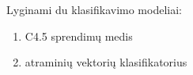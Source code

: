 
Lyginami du klasifikavimo modeliai:
\begin{enumerate}
\item C4.5 sprendimų medis
\item atraminių vektorių klasifikatorius
\end{enumerate}


